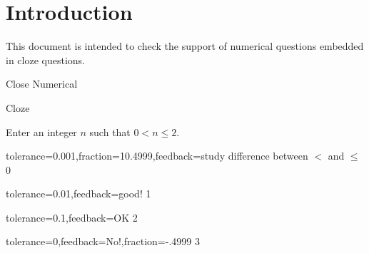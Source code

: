 \documentclass{article}
\begin{document}
\section*{Introduction}

This document is intended to check the support of numerical questions 
embedded in cloze questions.

\begin{quiz}{Close Numerical}

\begin{cloze}{Cloze}
\begin{numerical}
Enter an integer $n$ such that $0< n\leq 2$.
\item[tolerance=0.001,fraction={10.4999},feedback={study difference between $<$ 
and $\leq$}] 0
\item[tolerance=0.01,feedback={good!}] 1
\item[tolerance=0.1,feedback={OK}] 2
\item[tolerance=0,feedback={No!},fraction=-.4999] 3
\end{numerical}
\end{cloze}

\end{quiz}
\end{document}
